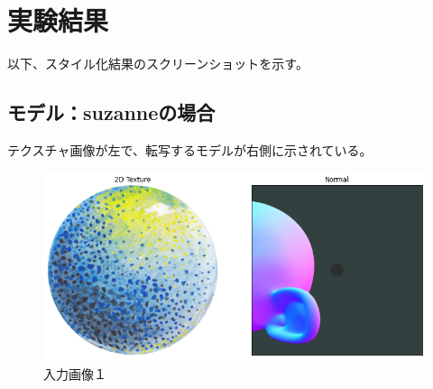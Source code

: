 \documentclass[dvipdfmx]{jsarticle}
\begin{document}
\section{実験結果}
以下、スタイル化結果のスクリーンショットを示す。
\subsection{モデル：suzanneの場合}
テクスチャ画像が左で、転写するモデルが右側に示されている。
\begin{figure}[H]
  \centering
  \includegraphics[scale=0.4]{images/suzzanne_input1.png}
  \caption{入力画像１}
\end{figure}
\end{document}
